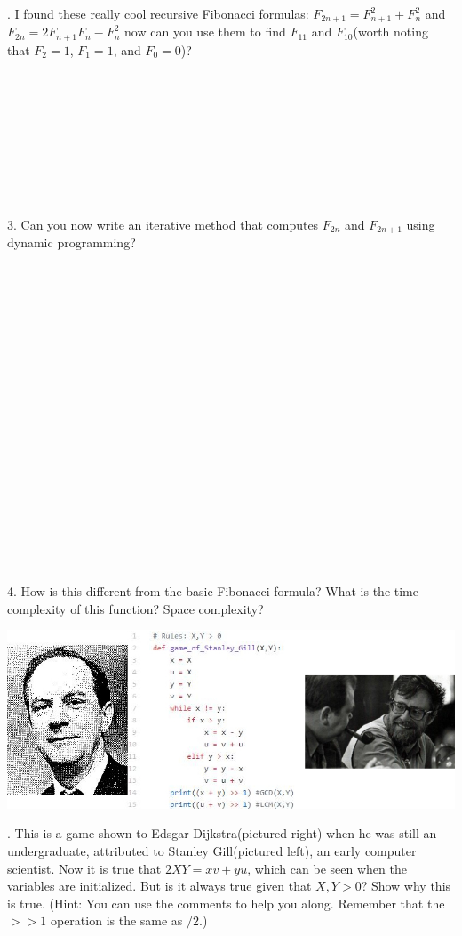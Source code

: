 \documentclass[12pt]{article}
\begin{document}
. I found these really cool recursive Fibonacci formulas: 
$F_{2n+1}=F_{n+1}^{2}+F_{n}^{2}$ and $F_{2n}=2F_{n+1}F_{n}-F_{n}^2$
 now can you use them to find $F_{11}$ and $F_{10}$(worth noting that
 $F_2 = 1$, $F_1 = 1$, and $F_0 = 0$)?\\\\\\\\\\\\\\\\\\\\
 3. Can you now write an iterative method that computes $F_{2n}$ and $F_{2n+1}$
 using dynamic programming?\\\\\\\\\\\\\\\\\\\\\\\\\\\\\\\\\\\\\\\\
 4. How is this different from the basic Fibonacci formula? What is the
 time complexity of this function? Space complexity?
    \FloatBarrier
\newpage
\centerline{\includegraphics[scale = 2]{comb.jpg}}
. This is a game shown to Edsgar Dijkstra(pictured right) when he was still an undergraduate, attributed to Stanley Gill(pictured left), an early computer scientist. Now it is true that $2XY = xv+yu$, which can be seen when the variables are initialized. But is it always true given that $X,Y > 0$? Show why this is true. (Hint: You can use the comments to help you along. Remember that the $>> 1 $ operation is the same as $ / 2$.)
\end{document}
